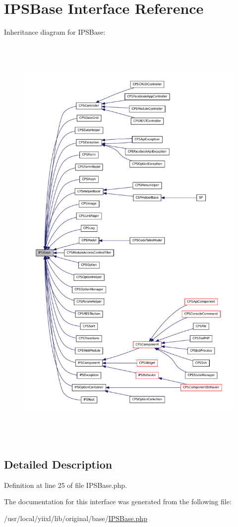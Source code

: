 \hypertarget{interfaceIPSBase}{
\section{IPSBase Interface Reference}
\label{interfaceIPSBase}
}


Inheritance diagram for IPSBase:\nopagebreak
\begin{figure}[H]
\begin{center}
\leavevmode
\includegraphics[height=600pt]{interfaceIPSBase__inherit__graph}
\end{center}
\end{figure}


\subsection{Detailed Description}


Definition at line 25 of file IPSBase.php.



The documentation for this interface was generated from the following file:\begin{DoxyCompactItemize}
\item 
/usr/local/yiixl/lib/original/base/\hyperlink{IPSBase_8php}{IPSBase.php}\end{DoxyCompactItemize}
